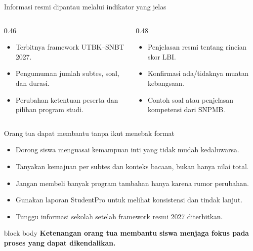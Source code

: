 \begin{frame}{Informasi resmi dipantau melalui indikator yang jelas}
  \begin{columns}[T,onlytextwidth]
    \begin{column}{0.46\textwidth}
      \begin{itemize}
        \item Terbitnya framework UTBK--SNBT 2027.
        \item Pengumuman jumlah subtes, soal, dan durasi.
        \item Perubahan ketentuan peserta dan pilihan program studi.
      \end{itemize}
    \end{column}
    \begin{column}{0.48\textwidth}
      \begin{itemize}
        \item Penjelasan resmi tentang rincian skor LBI.
        \item Konfirmasi ada/tidaknya muatan kebangsaan.
        \item Contoh soal atau penjelasan kompetensi dari SNPMB.
      \end{itemize}
    \end{column}
  \end{columns}
  \vspace{0.20cm}
\end{frame}

\begin{frame}{Orang tua dapat membantu tanpa ikut menebak format}
  \begin{itemize}
    \item Dorong siswa menguasai kemampuan inti yang tidak mudah kedaluwarsa.
    \item Tanyakan kemajuan per subtes dan konteks bacaan, bukan hanya nilai total.
    \item Jangan membeli banyak program tambahan hanya karena rumor perubahan.
    \item Gunakan laporan StudentPro untuk melihat konsistensi dan tindak lanjut.
    \item Tunggu informasi sekolah setelah framework resmi 2027 diterbitkan.
  \end{itemize}
  \vspace{0.20cm}
  \begin{beamercolorbox}[rounded=true,sep=0.20cm,wd=\textwidth]{block body}
    \centering\bfseries Ketenangan orang tua membantu siswa menjaga fokus pada proses yang dapat dikendalikan.
  \end{beamercolorbox}
\end{frame}

